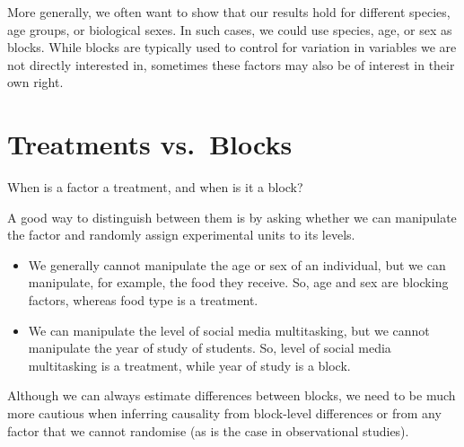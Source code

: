 \documentclass[
  letterpaper,
]{book}
\begin{document}
More generally, we often want to show that our results hold for
different species, age groups, or biological sexes. In such cases, we
could use species, age, or sex as blocks. While blocks are typically
used to control for variation in variables we are not directly
interested in, sometimes these factors may also be of interest in their
own right.

\section{Treatments vs.~Blocks}\label{treatments-vs.-blocks}

When is a factor a treatment, and when is it a block?

A good way to distinguish between them is by asking whether we can
manipulate the factor and randomly assign experimental units to its
levels.

\begin{itemize}
\item
  We generally cannot manipulate the age or sex of an individual, but we
  can manipulate, for example, the food they receive. So, age and sex
  are blocking factors, whereas food type is a treatment.
\item
  We can manipulate the level of social media multitasking, but we
  cannot manipulate the year of study of students. So, level of social
  media multitasking is a treatment, while year of study is a block.
\end{itemize}

Although we can always estimate differences between blocks, we need to
be much more cautious when inferring causality from block-level
differences or from any factor that we cannot randomise (as is the case
in observational studies).
\end{document}
